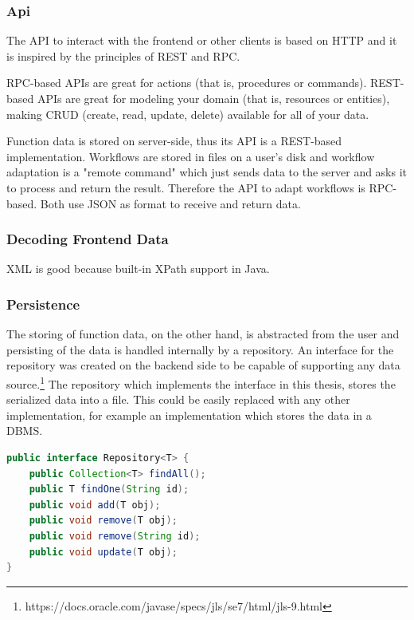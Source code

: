 \documentclass[a4paper,12pt,pdftex,halfparskip,cleardoubleempty,bibtotoc,liststotoc]{scrbook}
\begin{document}
\subsubsection{Api}
 
The API to interact with the frontend or other clients is based on HTTP and it is inspired by the principles of REST and RPC.

RPC-based APIs are great for actions (that is, procedures or commands).
REST-based APIs are great for modeling your domain (that is, resources or entities), making CRUD (create, read, update, delete) available for all of your data. \cite{online-smashingmagazine-rest-vs-rpc}

Function data is stored on server-side, thus its API is a REST-based implementation. Workflows are stored in files on a user's disk and workflow adaptation is a "remote command" which just sends data to the server and asks it to process and return the result. Therefore the API to adapt workflows is RPC-based. Both use JSON as format to receive and return data.

\subsubsection{Decoding Frontend Data}
\label{sec:backend-decoding}
 XML is good because built-in XPath support in Java.

\subsubsection{Persistence}
\label{sec:backend-persistence}

The storing of function data, on the other hand, is abstracted from the user and persisting of the data is handled internally by a repository.
An interface for the repository was created on the backend side to be capable of supporting any data source.\footnote{https://docs.oracle.com/javase/specs/jls/se7/html/jls-9.html} The repository which implements the interface in this thesis, stores the serialized data into a file. This could be easily replaced with any other implementation, for example an implementation which stores the data in a DBMS.

\begin{lstlisting}[language=Java, caption=Repository Interface]
public interface Repository<T> {
    public Collection<T> findAll();
    public T findOne(String id);
    public void add(T obj);
    public void remove(T obj);
    public void remove(String id);
    public void update(T obj);
}
\end{lstlisting}
\end{document}
